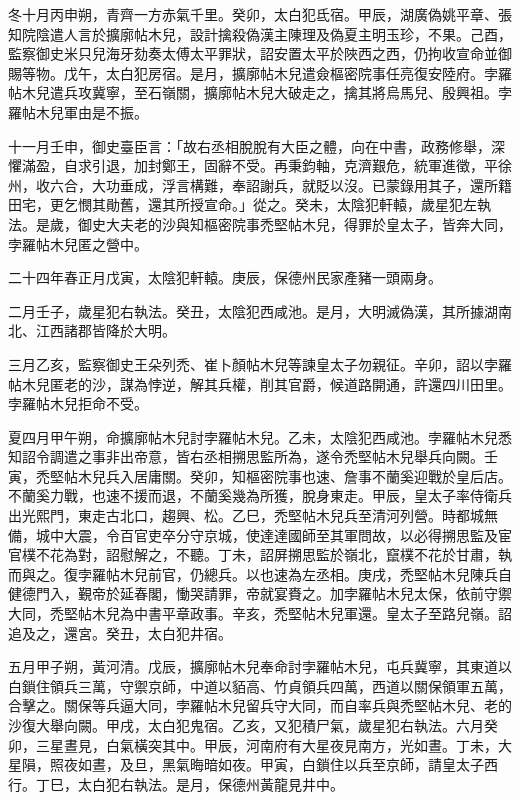 \begin{pinyinscope}
 冬十月丙申朔，青齊一方赤氣千里。癸卯，太白犯氐宿。甲辰，湖廣偽姚平章、張知院陰遣人言於擴廓帖木兒，設計擒殺偽漢主陳理及偽夏主明玉珍，不果。己酉，監察御史米只兒海牙劾奏太傅太平罪狀，詔安置太平於陜西之西，仍拘收宣命並御賜等物。戊午，太白犯房宿。是月，擴廓帖木兒遣僉樞密院事任亮復安陸府。孛羅帖木兒遣兵攻冀寧，至石嶺關，擴廓帖木兒大破走之，擒其將烏馬兒、殷興祖。孛羅帖木兒軍由是不振。



 十一月壬申，御史臺臣言：「故右丞相脫脫有大臣之體，向在中書，政務修舉，深懼滿盈，自求引退，加封鄭王，固辭不受。再秉鈞軸，克濟艱危，統軍進徵，平徐州，收六合，大功垂成，浮言構難，奉詔謝兵，就貶以沒。已蒙錄用其子，還所籍田宅，更乞憫其勛舊，還其所授宣命。」從之。癸未，太陰犯軒轅，歲星犯左執法。是歲，御史大夫老的沙與知樞密院事禿堅帖木兒，得罪於皇太子，皆奔大同，孛羅帖木兒匿之營中。



 二十四年春正月戊寅，太陰犯軒轅。庚辰，保德州民家產豬一頭兩身。



 二月壬子，歲星犯右執法。癸丑，太陰犯西咸池。是月，大明滅偽漢，其所據湖南北、江西諸郡皆降於大明。



 三月乙亥，監察御史王朵列禿、崔卜顏帖木兒等諫皇太子勿親征。辛卯，詔以孛羅帖木兒匿老的沙，謀為悖逆，解其兵權，削其官爵，候道路開通，許還四川田里。孛羅帖木兒拒命不受。



 夏四月甲午朔，命擴廓帖木兒討孛羅帖木兒。乙未，太陰犯西咸池。孛羅帖木兒悉知詔令調遣之事非出帝意，皆右丞相搠思監所為，遂令禿堅帖木兒舉兵向闕。壬寅，禿堅帖木兒兵入居庸關。癸卯，知樞密院事也速、詹事不蘭奚迎戰於皇后店。不蘭奚力戰，也速不援而退，不蘭奚幾為所獲，脫身東走。甲辰，皇太子率侍衛兵出光熙門，東走古北口，趨興、松。乙巳，禿堅帖木兒兵至清河列營。時都城無備，城中大震，令百官吏卒分守京城，使達達國師至其軍問故，以必得搠思監及宦官樸不花為對，詔慰解之，不聽。丁未，詔屏搠思監於嶺北，竄樸不花於甘肅，執而與之。復孛羅帖木兒前官，仍總兵。以也速為左丞相。庚戌，禿堅帖木兒陳兵自健德門入，覲帝於延春閣，慟哭請罪，帝就宴賚之。加孛羅帖木兒太保，依前守禦大同，禿堅帖木兒為中書平章政事。辛亥，禿堅帖木兒軍還。皇太子至路兒嶺。詔追及之，還宮。癸丑，太白犯井宿。



 五月甲子朔，黃河清。戊辰，擴廓帖木兒奉命討孛羅帖木兒，屯兵冀寧，其東道以白鎖住領兵三萬，守禦京師，中道以貊高、竹貞領兵四萬，西道以關保領軍五萬，合擊之。關保等兵逼大同，孛羅帖木兒留兵守大同，而自率兵與禿堅帖木兒、老的沙復大舉向闕。甲戌，太白犯鬼宿。乙亥，又犯積尸氣，歲星犯右執法。六月癸卯，三星晝見，白氣橫突其中。甲辰，河南府有大星夜見南方，光如晝。丁未，大星隕，照夜如晝，及旦，黑氣晦暗如夜。甲寅，白鎖住以兵至京師，請皇太子西行。丁巳，太白犯右執法。是月，保德州黃龍見井中。




\end{pinyinscope}
